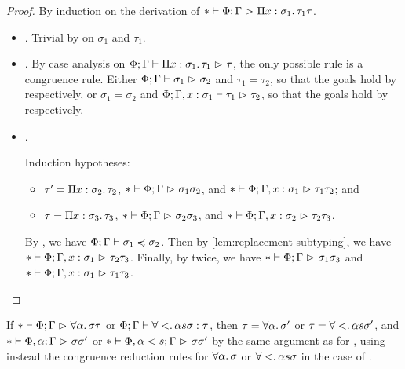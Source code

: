 \begin{proof}
By induction on the derivation of $\red*{\Phi; \Gamma}{\funtype{x}{\sigma_1}{\tau_1}}{\tau}$.
\begin{itemize}[noitemsep, label=\textbf{Cases}, leftmargin=*, labelindent=\parindent]
  \item {}. Trivial by  on $\sigma_1$ and $\tau_1$.
  \item {}. By case analysis on $\red{\Phi; \Gamma}{\funtype{x}{\sigma_1}{\tau_1}}{\tau}$,
    the only possible rule is a congruence rule.
    Either $\red{\Phi; \Gamma}{\sigma_1}{\sigma_2}$ and $\tau_1 = \tau_2$,
    so that the goals hold by  respectively,
    or $\sigma_1 = \sigma_2$ and $\red{\Phi; \Gamma, \annot{x}{\sigma_1}}{\tau_1}{\tau_2}$,
    so that the goals hold by  respectively.
  \item {}.
    \vspace{-\baselineskip}
    \begin{mathpar}
    \end{mathpar}
    Induction hypotheses:
    \begin{itemize}[noitemsep]
      \item $\tau' = \funtype{x}{\sigma_2}{\tau_2}$,
        $\red*{\Phi; \Gamma}{\sigma_1}{\sigma_2}$, and
        $\red*{\Phi; \Gamma, \annot{x}{\sigma_1}}{\tau_1}{\tau_2}$; and
      \item $\tau = \funtype{x}{\sigma_3}{\tau_3}$,
        $\red*{\Phi; \Gamma}{\sigma_2}{\sigma_3}$, and
        $\red*{\Phi; \Gamma, \annot{x}{\sigma_2}}{\tau_2}{\tau_3}$.
    \end{itemize}
    By , we have $\subtype{\Phi; \Gamma}{\sigma_1}{\sigma_2}$.
    Then by \cref{lem:replacement-subtyping}, we have $\red*{\Phi; \Gamma, \annot{x}{\sigma_1}}{\tau_2}{\tau_3}$.
    Finally, by  twice, we have
    $\red*{\Phi; \Gamma}{\sigma_1}{\sigma_3}$ and
    $\red*{\Phi; \Gamma, \annot{x}{\sigma_1}}{\tau_1}{\tau_3}$. \qedhere
\end{itemize}
\end{proof}

\begin{corollary}
If $\red*{\Phi; \Gamma}{\Funtype{\alpha}{\sigma}}{\tau}$
or $\type{\Phi; \Gamma}{\Funtype<{\alpha}{s}{\sigma}}{\tau}$,
then $\tau = \Funtype{\alpha}{\sigma'}$ or $\tau = \Funtype<{\alpha}{s}{\sigma'}$,
and $\red*{\Phi, \alpha; \Gamma}{\sigma}{\sigma'}$
or $\red*{\Phi, \bound{\alpha}{s}; \Gamma}{\sigma}{\sigma'}$
by the same argument as for ,
using instead the congruence reduction rules for
$\Funtype{\alpha}{\sigma}$ or $\Funtype<{\alpha}{s}{\sigma}$
in the case of .
\end{corollary}

